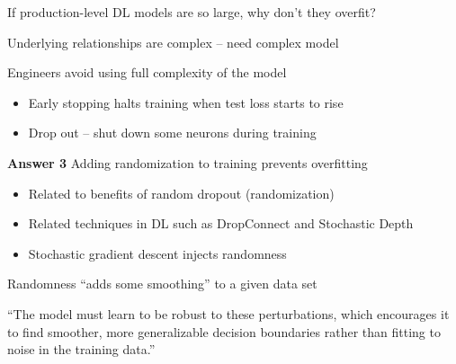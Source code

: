 \begin{frame}
    
    If production-level DL models are so large, why don't they overfit?

        \vspace{0.5em}
        \vspace{0.5em}
        \vspace{0.5em}

     Underlying relationships are complex -- need complex model

        \vspace{0.5em}
        \vspace{0.5em}
     Engineers avoid using full complexity of the model

    \begin{itemize}
        \item Early stopping halts training when test loss starts to rise
        \vspace{0.5em}
        \item Drop out -- shut down some neurons during training
    \end{itemize}


\end{frame}

\begin{frame}
    
    \textbf{Answer 3} Adding randomization to training prevents overfitting

    \begin{itemize}
        \item Related to benefits of random dropout (randomization)
        \vspace{0.5em}
        \item Related techniques in DL such as DropConnect and Stochastic Depth
        \vspace{0.5em}
        \item Stochastic gradient descent injects randomness
    \end{itemize}

        \vspace{0.5em}
        \vspace{0.5em}

    Randomness ``adds some smoothing'' to a given data set

        \vspace{0.5em}
    ``The model must learn to be robust to these perturbations, which encourages
    it to find smoother, more generalizable decision boundaries rather than
    fitting to noise in the training data.'' 



\end{frame}


